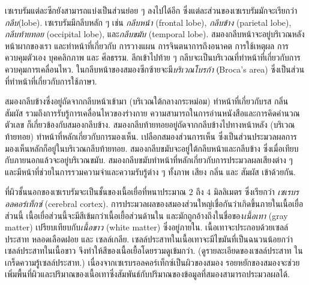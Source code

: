{\begin{shaded}
		เซเรบรัมแต่ละซีกยังสามารถแบ่งเป็นส่วนย่อย ๆ ลงไปได้อีก ซึ่งแต่ละส่วนของเซเรบรัมมักจะเรียกว่า\textit{กลีบ}(lobe).
		เซเรบรัมมีกลีบหลัก ๆ เช่น \textit{กลีบหน้า} (frontal lobe), \textit{กลีบข้าง} (parietal lobe), \textit{กลีบท้ายทอย} (occipital lobe), และ\textit{กลีบขมับ} (temporal lobe).
		สมองกลีบหน้าจะอยู่บริเวณหลังหน้าผากของเรา 
		และทำหน้าที่เกี่ยวกับ การวางแผน การจินตนาการถึงอนาคต การใช้เหตุผล
		การควบคุมตัวเอง บุคคลิกภาพ และ ศีลธรรม.
		ลึกเข้าไปท้าย ๆ กลีบจะเป็นบริเวณที่ทำหน้าที่เกี่ยวกับการควบคุมการเคลื่อนไหว.
		ในกลีบหน้าของสมองซีกซ้ายจะมี\textit{บริเวณโบรก้า} (ฺBroca's area) ซึ่งเป็นส่วนที่ทำหน้าที่เกี่ยวกับการใช้ภาษา.
		
		สมองกลีบข้างซึ่งอยู่ถัดจากกลีบหน้าเข้ามา (บริเวณใต้กลางกระหม่อม) ทำหน้าที่เกี่ยวกับรส กลิ่น สัมผัส รวมถึงการรับรู้การเคลื่อนไหวของร่างกาย
		ความสามารถในการอ่านหนังสือและการคิดคำนวณตัวเลข ก็เกี่ยวข้องกับสมองกลีบข้าง.
		สมองกลีบท้ายทอยอยู่ถัดจากกลีบข้างไปทางหน้าหลัง (บริเวณท้ายทอย) ทำหน้าที่หลักเกี่ยวกับการมองเห็น.
		เปลือกสมองส่วนการเห็น ซึ่งเป็นส่วนประมวลผลการมองเห็นหลักก็อยู่ในบริเวณกลีบท้ายทอย.
		สมองกลีบขมับจะอยู่ใต้กลีบหน้าและกลีบข้าง ซึ่งเมื่อเทียบกับภายนอกแล้วจะอยู่บริเวณขมับ.
		สมองกลีบขมับทำหน้าที่หลักเกี่ยวกับการประมวลผลเสียงต่าง ๆ และมีหน้าที่ช่วยในการรวมความจำและความรับรู้ต่าง ๆ ทั้งภาพ เสียง กลิ่น และ สัมผัส เข้าด้วยกัน.
		
		ที่ผิวชั้นนอกของเซเรบรัมจะเป็นชั้นของเนื้อเยื่อที่หนาประมาณ $2$ ถึง $4$ มิลลิเมตร ซึ่งเรียกว่า \textit{เซเรบรอลคอร์เท็กซ์} (cerebral cortex).
		การประมวลผลของสมองส่วนใหญ่เชื่อกันว่าเกิดขึ้นภายในเนื้อเยื่อส่วนนี้
		เนื้อเยื่อส่วนนี้จะมีสีเข้มกว่าเนื้อเยื้อส่วนด้านใน 
		และมักถูกอ้างถึงในชื่อของ\textit{เนื้อเทา} (gray matter)
		เปรียบเทียบกับ\textit{เนื้อขาว} (white matter) ซึ่งอยู่ภายใน.
		เนื้อเทาจะประกอบด้วยเซลล์ประสาท หลอดเลือดฝอย และ เซลล์เกลีย.
		เซลล์ประสาทในเนื้อเทาจะมีไขมันที่เป็นฉนวนน้อยกว่าเซลล์ประสาทในเนื้อขาว
		จึงทำให้สีของเนื้อเยื้อโดยรวมดูเข้มกว่า.
		(ดูรายละเอียดของเซลล์ประสาท ในเกร็ดความรู้เซลล์ประสาท.)
		เนื่องจากเซเรบรอลคอร์เท็กซ์เป็นผิวของสมอง รอยหยักของสมองจะช่วยเพิ่มพื้นที่ผิวและปริมาณของเนื้อเทาซึ่งสัมพันธ์กับปริมาณของข้อมูลที่สมองสามารถประมวลผลได้.
		

\end{shaded}}
